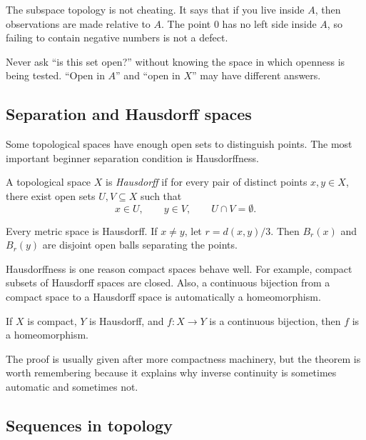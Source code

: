 The subspace topology is not cheating. It says that if you live inside $A$,
then observations are made relative to $A$. The point $0$ has no left side
inside $A$, so failing to contain negative numbers is not a defect.

\begin{trapbox}
Never ask ``is this set open?'' without knowing the space in which openness is
being tested. ``Open in $A$'' and ``open in $X$'' may have different answers.
\end{trapbox}

\subsection{Separation and Hausdorff spaces}

Some topological spaces have enough open sets to distinguish points. The most
important beginner separation condition is Hausdorffness.

\begin{definition}
A topological space $X$ is \emph{Hausdorff} if for every pair of distinct points
$x,y\in X$, there exist open sets $U,V\subseteq X$ such that
\[
x\in U,\qquad y\in V,\qquad U\cap V=\emptyset.
\]
\end{definition}

\begin{example}
Every metric space is Hausdorff. If $x\neq y$, let $r=d(x,y)/3$. Then
$B_r(x)$ and $B_r(y)$ are disjoint open balls separating the points.
\end{example}

Hausdorffness is one reason compact spaces behave well. For example, compact
subsets of Hausdorff spaces are closed. Also, a continuous bijection from a
compact space to a Hausdorff space is automatically a homeomorphism.

\begin{theorem}
If $X$ is compact, $Y$ is Hausdorff, and $f:X\to Y$ is a continuous bijection,
then $f$ is a homeomorphism.
\end{theorem}

The proof is usually given after more compactness machinery, but the theorem is
worth remembering because it explains why inverse continuity is sometimes
automatic and sometimes not.

\subsection{Sequences in topology}

